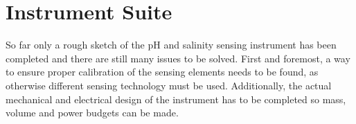\section{Instrument Suite}
So far only a rough sketch of the pH and salinity sensing instrument has been completed and there are still many issues to be solved. First and foremost, a way to ensure proper calibration of the sensing elements needs to be found, as otherwise different sensing technology must be used. Additionally, the actual mechanical and electrical design of the instrument has to be completed so mass, volume and power budgets can be made.